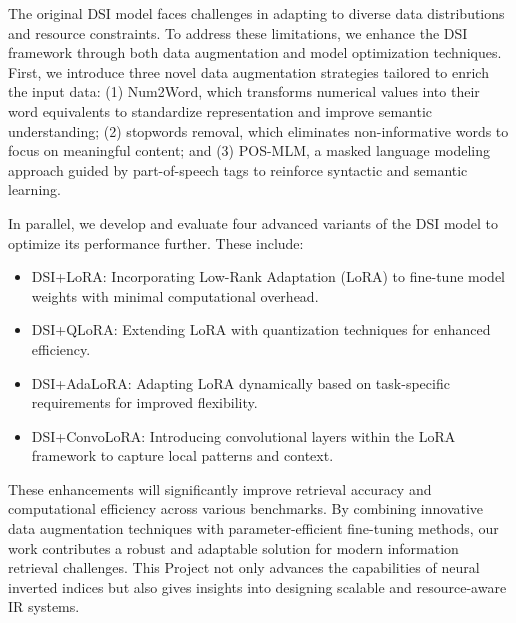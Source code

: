The original DSI model faces challenges in adapting to diverse data distributions and resource constraints. To address these limitations, we enhance the DSI framework through both data augmentation and model optimization techniques. First, we introduce three novel data augmentation strategies tailored to enrich the input data: (1) Num2Word, which transforms numerical values into their word equivalents to standardize representation and improve semantic understanding; (2) stopwords removal, which eliminates non-informative words to focus on meaningful content; and (3) POS-MLM, a masked language modeling approach guided by part-of-speech tags to reinforce syntactic and semantic learning.

In parallel, we develop and evaluate four advanced variants of the DSI model to optimize its performance further. These include:
\begin{itemize}
    \item DSI+LoRA: Incorporating Low-Rank Adaptation (LoRA) to fine-tune model weights with minimal computational overhead.
    \item DSI+QLoRA: Extending LoRA with quantization techniques for enhanced efficiency.
    \item DSI+AdaLoRA: Adapting LoRA dynamically based on task-specific requirements for improved flexibility.
    \item DSI+ConvoLoRA: Introducing convolutional layers within the LoRA framework to capture local patterns and context.
\end{itemize}


These enhancements will significantly improve retrieval accuracy and computational efficiency across various benchmarks. By combining innovative data augmentation techniques with parameter-efficient fine-tuning methods, our work contributes a robust and adaptable solution for modern information retrieval challenges. This Project not only advances the capabilities of neural inverted indices but also gives insights into designing scalable and resource-aware IR systems.

